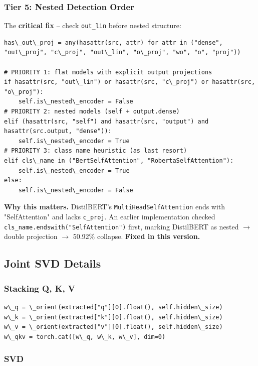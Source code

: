 \subsubsection{Tier 5: Nested Detection Order}

The \textbf{critical fix} -- check \texttt{out\_lin} before nested structure:

\begin{lstlisting}
has\_out\_proj = any(hasattr(src, attr) for attr in ("dense", "out\_proj", "c\_proj", "out\_lin", "o\_proj", "wo", "o", "proj"))

# PRIORITY 1: flat models with explicit output projections
if hasattr(src, "out\_lin") or hasattr(src, "c\_proj") or hasattr(src, "o\_proj"):
    self.is\_nested\_encoder = False
# PRIORITY 2: nested models (self + output.dense)
elif (hasattr(src, "self") and hasattr(src, "output") and hasattr(src.output, "dense")):
    self.is\_nested\_encoder = True
# PRIORITY 3: class name heuristic (as last resort)
elif cls\_name in ("BertSelfAttention", "RobertaSelfAttention"):
    self.is\_nested\_encoder = True
else:
    self.is\_nested\_encoder = False
\end{lstlisting}

\textbf{Why this matters.} DistilBERT's \texttt{MultiHeadSelfAttention} ends with 
"SelfAttention" and lacks \texttt{c\_proj}. An earlier implementation checked 
\texttt{cls\_name.endswith("SelfAttention")} first, marking DistilBERT as nested $\to$ 
double projection $\to$ 50.92\% collapse. \textbf{Fixed in this version.}

\subsection{Joint SVD Details}

\subsubsection{Stacking Q, K, V}

\begin{lstlisting}
w\_q = \_orient(extracted["q"][0].float(), self.hidden\_size)
w\_k = \_orient(extracted["k"][0].float(), self.hidden\_size)
w\_v = \_orient(extracted["v"][0].float(), self.hidden\_size)
w\_qkv = torch.cat([w\_q, w\_k, w\_v], dim=0)
\end{lstlisting}

\subsubsection{SVD}

